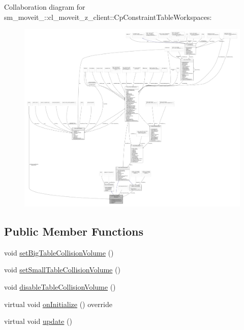 Collaboration diagram for sm\+\_\+moveit\+\_\+:\+:cl\+\_\+moveit\+\_\+z\+\_\+client\+:\+:Cp\+Constraint\+Table\+Workspaces\+:
\nopagebreak
\begin{figure}[H]
\begin{center}
\leavevmode
\includegraphics[width=350pt]{classsm__moveit__4_1_1cl__moveit__z__client_1_1CpConstraintTableWorkspaces__coll__graph}
\end{center}
\end{figure}
\subsection*{Public Member Functions}
\begin{DoxyCompactItemize}
\item 
void \hyperlink{classsm__moveit__4_1_1cl__moveit__z__client_1_1CpConstraintTableWorkspaces_ac27a48c21b8b476b426b0bf9d7000c8b}{set\+Big\+Table\+Collision\+Volume} ()
\item 
void \hyperlink{classsm__moveit__4_1_1cl__moveit__z__client_1_1CpConstraintTableWorkspaces_a8652bbff65de57c74d8ce4da01ea2484}{set\+Small\+Table\+Collision\+Volume} ()
\item 
void \hyperlink{classsm__moveit__4_1_1cl__moveit__z__client_1_1CpConstraintTableWorkspaces_a9c9ccbf8c1bf5c5a604a782f7c375466}{disable\+Table\+Collision\+Volume} ()
\item 
virtual void \hyperlink{classsm__moveit__4_1_1cl__moveit__z__client_1_1CpConstraintTableWorkspaces_a86292aeca8f4672617b6ea617dfb4a73}{on\+Initialize} () override
\item 
virtual void \hyperlink{classsm__moveit__4_1_1cl__moveit__z__client_1_1CpConstraintTableWorkspaces_ae0b53f2cceedd97e053e66b1df2d9486}{update} ()
\end{DoxyCompactItemize}
